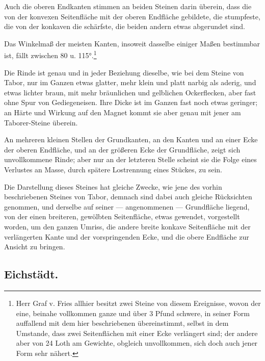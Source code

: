 \documentclass[a4paper, 11pt, oneside, german]{article}
\begin{document}
Auch die oberen Endkanten stimmen an beiden Steinen darin überein, dass die von der konvexen Seitenfläche mit der oberen Endfläche gebildete, die stumpfeste, die von der konkaven die schärfste, die beiden andern etwas abgerundet sind.

Das Winkelmaß der meisten Kanten, insoweit dasselbe einiger Maßen bestimmbar ist, fällt zwischen 80 u. 115°.\footnote{Herr Graf v. Fries allhier besitzt zwei Steine von diesem Ereignisse, wovon der eine, beinahe vollkommen ganze und über 3 Pfund schwere, in seiner Form auffallend mit dem hier beschriebenen übereinstimmt, selbst in dem Umstande, dass zwei Seitenflächen mit einer Ecke verlängert sind; der andere aber von 24 Loth am Gewichte, obgleich unvollkommen, sich doch auch jener Form sehr nähert.}

Die Rinde ist genau und in jeder Beziehung dieselbe, wie bei dem Steine von Tabor, nur im Ganzen etwas glatter, mehr klein und platt narbig als aderig, und etwas lichter braun, mit mehr bräunlichen und gelblichen Ockerflecken, aber fast ohne Spur von Gediegeneisen. Ihre Dicke ist im Ganzen fast noch etwas geringer; an Härte und Wirkung auf den Magnet kommt sie aber genau mit jener am Taborer-Steine überein.

An mehreren kleinen Stellen der Grundkanten, an den Kanten und an einer Ecke der oberen Endfläche, und an der größeren Ecke der Grundfläche, zeigt sich unvollkommene Rinde; aber nur an der letzteren Stelle scheint sie die Folge eines Verlustes an Masse, durch spätere Lostrennung eines Stückes, zu sein.

Die Darstellung dieses Steines hat gleiche Zwecke, wie jene des vorhin beschriebenen Steines von Tabor, demnach sind dabei auch gleiche Rücksichten genommen, und derselbe auf seiner --- angenommenen --- Grundfläche liegend, von der einen breiteren, gewölbten Seitenfläche, etwas gewendet, vorgestellt worden, um den ganzen Umriss, die andere breite konkave Seitenfläche mit der verlängerten Kante und der vorspringenden Ecke, und die obere Endfläche zur Ansicht zu bringen.

\subsection{Eichstädt.}
\end{document}
